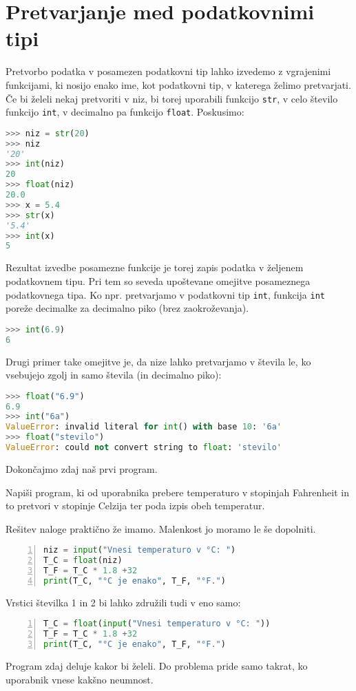 \section{Pretvarjanje med podatkovnimi tipi}
Pretvorbo podatka v posamezen podatkovni tip lahko izvedemo z vgrajenimi funkcijami, ki nosijo enako ime, kot podatkovni tip, v katerega želimo pretvarjati. Če bi želeli nekaj pretvoriti v niz, bi torej uporabili funkcijo \texttt{str}, v celo število funkcijo \texttt{int}, v decimalno pa funkcijo \texttt{float}. Poskusimo:
\begin{lstlisting}[language=Python]
>>> niz = str(20)
>>> niz
'20'
>>> int(niz)
20
>>> float(niz)
20.0
>>> x = 5.4
>>> str(x)
'5.4'
>>> int(x)
5
\end{lstlisting}
Rezultat izvedbe posamezne funkcije je torej zapis podatka v željenem podatkovnem tipu. Pri tem so seveda upoštevane omejitve posameznega podatkovnega tipa. Ko npr. pretvarjamo v podatkovni tip \texttt{int}, funkcija \texttt{int} poreže decimalke za decimalno piko (brez zaokroževanja). 
\begin{lstlisting}[language=Python]
>>> int(6.9)
6
\end{lstlisting}
Drugi primer take omejitve je, da nize lahko pretvarjamo v števila le, ko vsebujejo zgolj in samo števila (in decimalno piko):
\begin{lstlisting}[language=Python]
>>> float("6.9")
6.9
>>> int("6a")
ValueError: invalid literal for int() with base 10: '6a'
>>> float("stevilo")
ValueError: could not convert string to float: 'stevilo'
\end{lstlisting}

Dokončajmo zdaj naš prvi program.
\begin{zgled}
Napiši program, ki od uporabnika prebere temperaturo v stopinjah Fahrenheit in to pretvori v stopinje Celzija ter poda izpis obeh temperatur.
\end{zgled}
\begin{resitev}
Rešitev naloge praktično že imamo. Malenkost jo moramo le še dopolniti.
\begin{lstlisting}[language=Python,numbers=left]
niz = input("Vnesi temperaturo v °C: ")
T_C = float(niz)
T_F = T_C * 1.8 +32
print(T_C, "°C je enako", T_F, "°F.")
\end{lstlisting}
Vrstici številka 1 in 2 bi lahko združili tudi v eno samo:
\begin{lstlisting}[language=Python,numbers=left]
T_C = float(input("Vnesi temperaturo v °C: "))
T_F = T_C * 1.8 +32
print(T_C, "°C je enako", T_F, "°F.")
\end{lstlisting}
\end{resitev}
Program zdaj deluje kakor bi želeli. Do problema pride samo takrat, ko uporabnik vnese kakšno neumnost.

